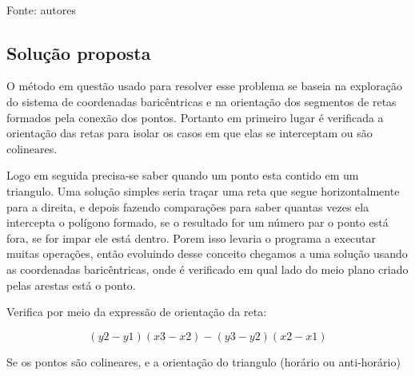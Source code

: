 \documentclass[12pt,a4paper]{article}
\begin{document}
\begin{center}
	\footnotesize{\\Fonte: autores}
\end{center}

\subsection{Solução proposta}

O método em questão usado para resolver esse problema se baseia na exploração do sistema de coordenadas baricêntricas e na orientação dos segmentos de retas formados pela conexão dos pontos. Portanto em primeiro lugar é verificada a orientação das retas para isolar os casos em que elas se interceptam ou são colineares.

Logo em seguida precisa-se saber quando um ponto esta contido em um triangulo. Uma solução simples seria traçar uma reta que segue horizontalmente para a direita, e depois fazendo comparações para saber quantas vezes ela intercepta o polígono formado, se o resultado for um número par o ponto está fora, se for impar ele está dentro. Porem isso levaria o programa a executar muitas operações, então evoluindo desse conceito chegamos a uma solução usando as coordenadas baricêntricas, onde é verificado em qual lado do meio plano criado pelas arestas está o ponto.

Verifica por meio da expressão de orientação da reta:

\[(y2-y1) (x3-x2) - (y3-y2) (x2-x1)\]

Se os pontos são colineares, e a orientação do triangulo (horário ou anti-horário)
\end{document}

